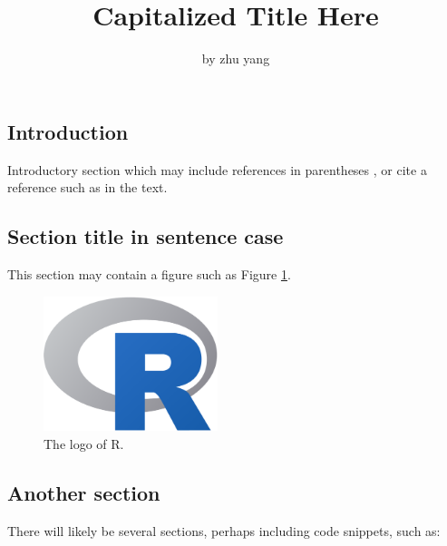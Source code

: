\title{Capitalized Title Here}
\author{by zhu yang}

\maketitle


\hypertarget{introduction}{%
\subsection{Introduction}\label{introduction}}

Introductory section which may include references in parentheses
\citep{R}, or cite a reference such as \citet{R} in the text.

\hypertarget{section-title-in-sentence-case}{%
\subsection{Section title in sentence
case}\label{section-title-in-sentence-case}}

This section may contain a figure such as Figure \ref{fig:Rlogo}.

\begin{Schunk}
\begin{figure}[htbp]

{\centering \includegraphics[width=2in]{Rlogo} 

}

\caption[The logo of R]{The logo of R.}\label{fig:Rlogo}
\end{figure}
\end{Schunk}

\hypertarget{another-section}{%
\subsection{Another section}\label{another-section}}

There will likely be several sections, perhaps including code snippets,
such as:

